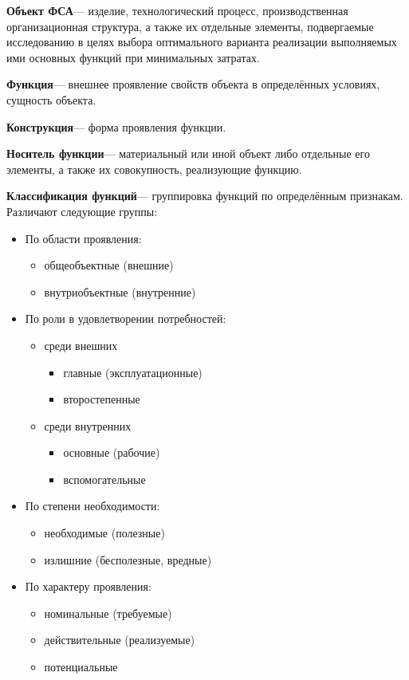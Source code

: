 \textbf{Объект ФСА}--- изделие, технологический процесс, производственная
организационная структура, а также их отдельные элементы, подвергаемые
исследованию в целях выбора оптимального варианта реализации выполняемых ими
основных функций при минимальных затратах.

\textbf{Функция}--- внешнее проявление свойств объекта в определённых
условиях, сущность объекта.

\textbf{Конструкция}--- форма проявления функции.

\textbf{Носитель функции}--- материальный или иной объект либо отдельные
его элементы, а также их совокупность, реализующие функцию.

\textbf{Классификация функций}--- группировка функций по определённым
признакам.
Различают следующие группы:
\begin{itemize}
    \item По области проявления:
        \begin{itemize}
            \item общеобъектные (внешние)
            \item внутриобъектные (внутренние)
        \end{itemize}
    \item По роли в удовлетворении потребностей:
        \begin{itemize}
            \item среди внешних
                \begin{itemize}
                    \item главные (эксплуатационные)
                    \item второстепенные
                \end{itemize}
            \item среди внутренних
                \begin{itemize}
                    \item основные (рабочие)
                    \item вспомогательные
                \end{itemize}
        \end{itemize}
    \item По степени необходимости:
        \begin{itemize}
            \item необходимые (полезные)
            \item излишние (бесполезные, вредные)
        \end{itemize}
    \item По характеру проявления:
        \begin{itemize}
            \item номинальные (требуемые)
            \item действительные (реализуемые)
            \item потенциальные
        \end{itemize}
\end{itemize}


